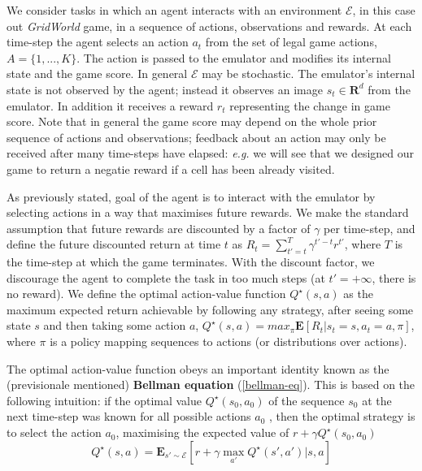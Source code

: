 \documentclass{article}
\begin{document}
We consider tasks in which an agent interacts with an environment $\mathcal{E}$, in this case out \textit{GridWorld} game,
in a sequence of actions, observations and rewards. At each time-step the agent selects an action $a_{t}$ from the set of legal game actions, $A = \{1, . . . , K\}$. The action is passed to the emulator and
modifies its internal state and the game score. In general $\mathcal{E}$ may be stochastic. The emulator’s
internal state is not observed by the agent; instead it observes an image $s_t \in \mathbf{R}^d $ from the emulator. %
In addition it receives a reward $r_t$ representing the change in game score. Note that in general the game score may depend on the
whole prior sequence of actions and observations; feedback about an action may only be received
after many time-steps have elapsed: \textit{e.g.} we will see that we designed our game to return a negatie reward if a cell has been already visited.  %

As previously stated, goal of the agent is to interact with the emulator by selecting actions in a way that maximises
future rewards. We make the standard assumption that future rewards are discounted by a factor of $\gamma$ per time-step, and define the future discounted return at time $t$ as $R_t = \sum_{t'=t}^{T}\gamma^{t'-t}r^{t'}$, where $T$
is the time-step at which the game terminates. With the discount factor, we discourage the agent to complete the task in too much steps (at $t'=+\infty$, there is no reward). We define the optimal action-value function $Q^\star(s, a)$ as the maximum expected return achievable by following any strategy, after seeing some state $s$ and then taking some action $a$, $Q^\star (s, a) = max_\pi \mathbf{E}[R_t |s_t = s, a_ t = a, \pi]$, where $\pi$ is a policy mapping sequences to actions (or distributions over actions).

The optimal action-value function obeys an important identity known as the (previsionale mentioned) \textbf{Bellman equation} (\ref{bellman-eq}). This is based on the following intuition: if the optimal value $Q^\star (s_0 , a_0 )$ of the sequence $s_0$ at the next
time-step was known for all possible actions $a_0$ , then the optimal strategy is to select the action $a_0$, maximising the expected value of $r + \gamma Q^\star (s_0, a_0)$
\begin{equation}
\label{bellman-eq}
	Q^\star (s,a) = \mathbf{E}_{s' \sim \mathcal{E}} [ r + \gamma \max_{a'} Q^\star(s', a') | s, a  ]
\end{equation}
\end{document}
